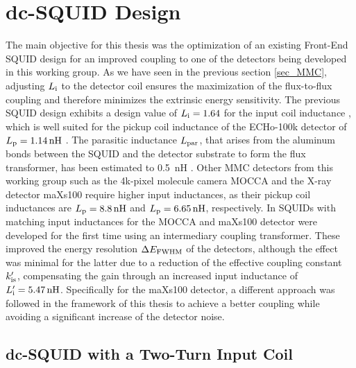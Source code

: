 \chapter{dc-SQUID Design} \label{ch_SQUIDdesign}

The main objective for this thesis was the optimization of an existing Front-End SQUID design for an improved coupling to one of the detectors being developed in this working group. As we have seen in the previous section \ref{sec_MMC}, adjusting $L_{\rm i}$ to the detector coil ensures the maximization of the flux-to-flux coupling and therefore minimizes the extrinsic energy sensitivity. The previous SQUID design exhibits a design value of $L_{\rm i}=1.64$ for the input coil inductance \cite{Bauer2022}, which is well suited for the pickup coil inductance of the ECHo-100k detector of $L_{\rm p}=\qty{1.14}{\nano\henry}$ \cite{Mantegazzini2021}. The parasitic inductance $L_{\rm par}$, that arises from the aluminum bonds between the SQUID and the detector substrate to form the flux transformer, has been estimated to \qty{0.5}{\nano\henry} \cite{Hengstler2017}. Other MMC detectors from this working group such as the 4k-pixel molecule camera MOCCA and the X-ray detector maXs100 require higher input inductances, as their pickup coil inductances are $L_{\rm p}=\qty{8.8}{\nano\henry}$ and $L_{\rm p}=\qty{6.65}{\nano\henry}$, respectively. In \cite{Bauer2022} SQUIDs with matching input inductances for the MOCCA and maXs100 detector were developed for the first time using an intermediary coupling transformer. These improved the energy resolution $\Delta E_{\rm FWHM}$ of the detectors, although the effect was minimal for the latter due to a reduction of the effective coupling constant $k_{\rm is}'$, compensating the gain through an increased input inductance of $L_{\rm i}'=\qty{5.47}{\nano\henry}$. Specifically for the maXs100 detector, a different approach was followed in the framework of this thesis to achieve a better coupling while avoiding a significant increase of the detector noise.  

\section{dc-SQUID with a Two-Turn Input Coil}

